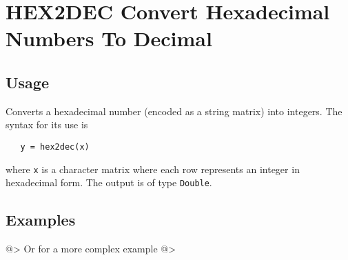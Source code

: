 \section{HEX2DEC Convert Hexadecimal Numbers To Decimal}

\subsection{Usage}

Converts a hexadecimal number (encoded as a string matrix) into integers.
The syntax for its use is
\begin{verbatim}
   y = hex2dec(x)
\end{verbatim}
where \verb|x| is a character matrix where each row represents an integer
in hexadecimal form.  The output is of type \verb|Double|.
\subsection{Examples}

@>
Or for a more complex example
@>
